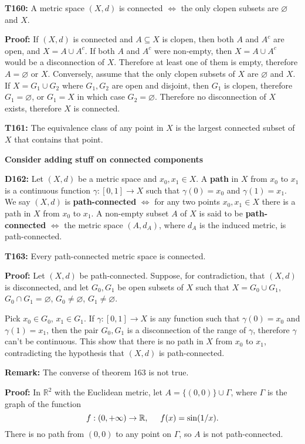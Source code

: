 \documentclass[twocolumn,10pt]{article}
\begin{document}
\textbf{T160:} A metric space $(X,d)$ is connected $\Leftrightarrow$ the only clopen subsets are $\varnothing$ and $X$.

\color{red}
\textbf{Proof:} If $(X,d)$ is connected and $A\subseteq X$ is clopen, then both $A$ and $A^c$ are open, and $X=A\cup A^c$. If both $A$ and $A^c$ were non-empty, then $X=A\cup A^c$ would be a disconnection of $X$. Therefore at least one of them is empty, therefore $A=\varnothing$ or $X$. Conversely, assume that the only clopen subsets of $X$ are $\varnothing$ and $X$. If $X=G_1\cup G_2$ where $G_1,G_2$ are open and disjoint, then $G_1$ is clopen, therefore $G_1=\varnothing$, or $G_1=X$ in which case $G_2=\varnothing$. Therefore no disconnection of $X$ exists, therefore $X$ is connected.
\color{black}

\textbf{T161:} The equivalence class of any point in $X$ is the largest connected subset of $X$ that contains that point.

\color{red}
\textbf{Consider adding stuff on connected components}
\color{black}

\textbf{D162:} Let $(X,d)$ be a metric space and $x_0,x_1\in X$. A \textbf{path} in $X$ from $x_0$ to $x_1$ is a continuous function $\gamma:[0,1]\to X$ such that $\gamma(0)=x_0$ and $\gamma(1)=x_1$. We say $(X,d)$ is \textbf{path-connected} $\Leftrightarrow$ for any two points $x_0,x_1\in X$ there is a path in $X$ from $x_0$ to $x_1$. A non-empty subset $A$ of $X$ is said to be \textbf{path-connected} $\Leftrightarrow$ the metric space $(A,d_A)$, where $d_A$ is the induced metric, is path-connected.

\textbf{T163:} Every path-connected metric space is connected.

\color{red}
\textbf{Proof:} Let $(X,d)$ be path-connected. Suppose, for contradiction, that $(X,d)$ is disconnected, and let $G_0,G_1$ be open subsets of $X$ such that $X=G_0\cup G_1$, $G_0\cap G_1=\varnothing$, $G_0\neq\varnothing$, $G_1\neq\varnothing$.

Pick $x_0\in G_0$, $x_1\in G_1$. If $\gamma:[0,1]\to X$ is any function such that $\gamma(0)=x_0$ and $\gamma(1)=x_1$, then the pair $G_0,G_1$ is a disconnection of the range of $\gamma$, therefore $\gamma$ can't be continuous. This show that there is no path in $X$ from $x_0$ to $x_1$, contradicting the hypothesis that $(X,d)$ is path-connected.
\color{black}

\textbf{Remark:} The converse of theorem 163 is not true.

\color{red}
\textbf{Proof:} In $\mathbb{R}^2$ with the Euclidean metric, let $A=\{(0,0)\}\cup\Gamma$, where $\Gamma$ is the graph of the function
\begin{equation*}
    f:(0,+\infty)\to\mathbb{R}, \hspace{0.5cm} f(x) = \sin(1/x).
\end{equation*}
There is no path from $(0,0)$ to any point on $\Gamma$, so $A$ is not path-connected.
\end{document}
